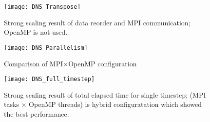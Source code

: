 \begin{figure}[htb]
 \begin{center}
   \texttt{[image: DNS\_Transpose]}
   \caption{Strong scaling result of data reorder and MPI communication; OpenMP is not used.}
   \label{fig:DNS_strong_scale_transpose}
 \end{center}
\end{figure}


\begin{figure}[htb]
 \begin{center}
   \texttt{[image: DNS\_Parallelism]}
   \caption{Comparison of MPI$\times$OpenMP configuration}
   \label{fig:DNS_MPI_OpenMP}
 \end{center}
\end{figure}

\begin{figure}[htb]
 \begin{center}
   \texttt{[image: DNS\_full\_timestep]}
   \caption{Strong scaling result of total elapsed time for single timestep; (MPI tasks $\times$ OpenMP threads) is hybrid configuratation which showed  the best performance.}
   \label{fig:DNS_strong_scale_total_elapsed_time}
 \end{center}
\end{figure}






